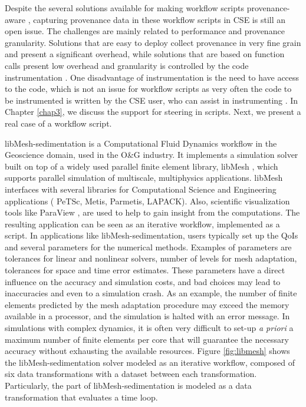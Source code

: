 Despite the several solutions available for making workflow scripts
provenance-aware \cite{Stamatogiannakis2016Trade-Offs,Moreau2018Templating,Pimentel2017noWorkflow:},
capturing provenance data in these workflow scripts in CSE is still an open issue.
The challenges are mainly related to performance and provenance
granularity. Solutions that are easy to deploy collect provenance
in very fine grain and present a significant overhead, while solutions
that are based on function calls present low overhead and granularity is
controlled by the code instrumentation \cite{Stamatogiannakis2016Trade-Offs}.
 One disadvantage of instrumentation is the need to have access to the code, which is not an
issue for workflow scripts as very often the code to be instrumented is written by the CSE user, who can assist in instrumenting
\cite{Silva2018Capturing}. 
In Chapter \ref{chap3}, we discuss the support for steering in scripts.
Next, we present a real case of a workflow script.


\label{sub_libmesh}

libMesh-sedimentation
\cite{Camata2018In}
is a
Computational Fluid Dynamics workflow in the Geoscience domain, used in the O\&G industry. It implements a
simulation solver built on top of a widely used parallel finite element library,
libMesh \cite{Kirk2006libMesh},
which supports parallel simulation of multiscale, multiphysics applications.
libMesh interfaces with several libraries for Computational Science and Engineering applications (\eg{} PeTSc, Metis, Parmetis, LAPACK).
Also, scientific visualization tools like ParaView \cite{Ayachit2015ParaView},
are used to help to gain insight from the computations.
The resulting application can be seen as an iterative workflow, implemented as a script.  
In applications like libMesh-sedimentation, users typically set up
the QoIs and several parameters for the numerical methods. Examples of
parameters are tolerances for linear and nonlinear solvers, number of
levels for mesh adaptation, tolerances for space and time error
estimates. These parameters have a direct influence on the accuracy
and simulation costs, and bad choices may lead to inaccuracies and even
to a simulation crash.
As an example, the number of finite elements
predicted by the mesh adaptation procedure may exceed the memory
available in a processor, and the simulation is halted with an error
message. In simulations with complex dynamics, it is often very
difficult to set-up \textit{a priori} a maximum number of finite elements per
core that will guarantee the necessary accuracy without exhausting the
available resources.
Figure \ref{fig:libmesh} shows the libMesh-sedimentation solver modeled as an iterative workflow, composed of six data transformations with a dataset between each transformation. Particularly, the  part of libMesh-sedimentation is modeled as a data transformation that evaluates a time loop.


